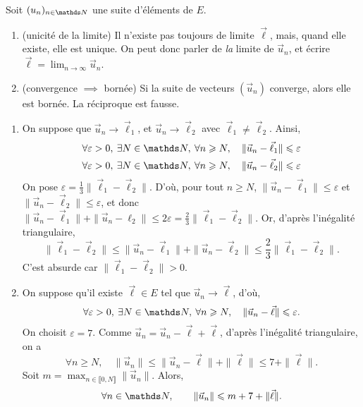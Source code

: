 \begin{prop}
	Soit $(u_n)_{n\in\N}$\/ une suite d'éléments de $E$.
	\begin{enumerate}
		\item (unicité de la limite) Il n'existe pas toujours de limite $\vec{\ell}$, mais, quand elle existe, elle est unique. On peut donc parler de \textit{la} limite de $\vec{u}_n$, et écrire $\vec{\ell} = \lim_{n\to \infty} \vec{u}_n$.
		\item (convergence $\implies$ bornée) Si la suite de vecteurs $(\vec{u}_n)$\/ converge, alors elle est bornée. {\color{red}La réciproque est fausse.}
	\end{enumerate}
\end{prop}

\begin{prv}
	\begin{enumerate}
		\item On suppose que $\vec{u}_n \to \vec{\ell}_1$, et $\vec{u}_n \to \vec{\ell}_2$\/ avec $\vec{\ell}_1 \neq \vec{\ell}_2$. Ainsi,
			\begin{gather*}
				\forall \varepsilon > 0,\: \exists N \in \N,\: \forall n \ge N,\quad \|\vec{u}_n - \vec{\ell}_1\|\le \varepsilon\\
				\forall \varepsilon > 0,\: \exists N \in \N,\: \forall n \ge N,\quad \|\vec{u}_n - \vec{\ell}_2\|\le \varepsilon\\
			\end{gather*}
			On pose $\varepsilon = \frac{1}{3}\|\vec{\ell}_1 - \vec{\ell}_2\|$.
			D'où, pour tout $n \ge N$, $\|\vec{u}_n - \vec{\ell}_1\| \le \varepsilon$\/ et $\|\vec{u}_n - \vec{\ell}_2\| \le \varepsilon$, et donc $\|\vec{u}_n - \vec{\ell}_1\| + \|\vec{u}_n - \ell_2\| \le 2 \varepsilon = \frac{2}{3} \|\vec{\ell}_1 - \vec{\ell}_2\|$.
			Or, d'après l'inégalité triangulaire, \[
				\|\vec{\ell}_1 - \vec{\ell}_2\| \le \|\vec{u}_n - \vec{\ell}_1\| + \|\vec{u}_n - \vec{\ell}_2\| \le \frac{2}{3} \|\vec{\ell}_1 - \vec{\ell}_2\|
			.\] C'est absurde car $\|\vec{\ell}_1 - \vec{\ell}_2\| > 0$.
		\item On suppose qu'il existe $\vec{\ell} \in E$\/ tel que $\vec{u}_n \to \vec{\ell}$, d'où, \[
				\forall \varepsilon > 0,\: \exists N \in \N,\: \forall n \ge N,\quad \|\vec{u}_n - \vec{\ell}\| \le \varepsilon
			.\] On choisit $\varepsilon = 7$. Comme $\vec{u}_n = \vec{u}_n - \vec{\ell} + \vec{\ell}$, d'après l'inégalité triangulaire, on a \[
				\forall n \ge N, \quad \|\vec{u}_n\| \le \|\vec{u}_n - \vec{\ell}\| + \|\vec{\ell}\| \le 7 + \|\vec{\ell}\|
			.\] Soit $m = \max_{n \in \llbracket 0,N \rrbracket} \|\vec{u}_n\|$. Alors, \[
				\forall n \in \N,\quad\quad \|\vec{u}_n\| \le m + 7 + \|\vec{\ell}\|
			.\]
	\end{enumerate}
\end{prv}

